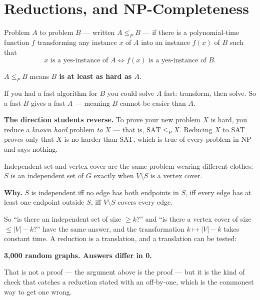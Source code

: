 \section{Reductions, and NP-Completeness}

\begin{definitionbox}
Problem $A$  to problem $B$ --- written $A \le_{P} B$ --- if
there is a polynomial-time function $f$ transforming any instance $x$ of $A$
into an instance $f(x)$ of $B$ such that
\[ x \text{ is a yes-instance of } A \iff f(x) \text{ is a yes-instance of } B. \]
\end{definitionbox}

\begin{conceptbox}
$A \le_{P} B$ means \textbf{$B$ is at least as hard as $A$}.

\smallskip
If you had a fast algorithm for $B$ you could solve $A$ fast: transform, then
solve. So a fast $B$ gives a fast $A$ --- meaning $B$ cannot be easier than
$A$.

\smallskip
\textbf{The direction students reverse.} To prove your new problem $X$ is hard,
you reduce a \emph{known hard} problem \emph{to} $X$ --- that is,
$\text{SAT} \le_{P} X$. Reducing $X$ to SAT proves only that $X$ is no harder
than SAT, which is true of every problem in NP and says nothing.
\end{conceptbox}

\begin{worked}
Independent set and vertex cover are the same problem wearing different
clothes: $S$ is an independent set of $G$ exactly when $V \setminus S$ is a
vertex cover.

\smallskip
\textbf{Why.} $S$ is independent iff no edge has both endpoints in $S$, iff
every edge has at least one endpoint outside $S$, iff $V \setminus S$ covers
every edge.

\smallskip
So ``is there an independent set of size $\ge k$?'' and ``is there a vertex
cover of size $\le |V|-k$?'' have the same answer, and the transformation
$k \mapsto |V|-k$ takes constant time. A reduction is a translation, and a
translation can be tested:
\begin{center}
\textbf{3{,}000 random graphs. Answers differ in 0.}
\end{center}

\smallskip
That is not a proof --- the argument above is the proof --- but it is the kind
of check that catches a reduction stated with an off-by-one, which is the
commonest way to get one wrong.
\end{worked}

